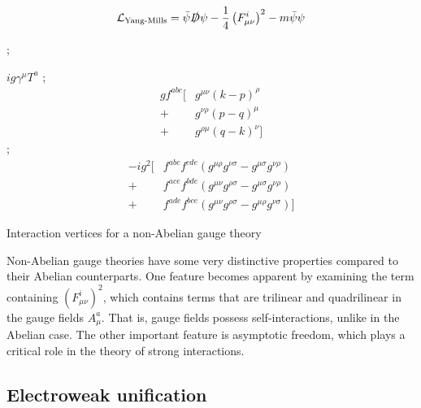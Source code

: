 $$\mathcal{L}_\text{Yang-Mills} = \bar{\psi}\slashed{D}\psi - \frac{1}{4}\left(F_{\mu\nu}^i\right)^2 - m\bar{\psi}\psi$$
\begin{marginfigure}[-3cm]
  ;

  $ig\gamma^\mu T^a$
\vskip 1cm
;
\begin{align*}
  gf^{abc}[&g^{\mu\nu}(k-p)^\rho\\
          +&g^{\nu\rho}(p-q)^\mu\\
          +&g^{\rho\mu}(q-k)^\nu]
\end{align*}
\vskip 1cm
;
\begin{align*}
 -ig^2[&f^{abc}f^{cde}(g^{\mu\rho}g^{\nu\sigma}-g^{\mu\sigma}g^{\nu\rho})\\
       +&f^{ace}f^{bde}(g^{\mu\nu}g^{\rho\sigma}-g^{\mu\sigma}g^{\nu\rho})\\
       +&f^{ade}f^{bce}(g^{\mu\nu}g^{\rho\sigma}-g^{\mu\rho}g^{\nu\sigma})]
\end{align*}
\caption{Interaction vertices for a non-Abelian gauge theory}
\end{marginfigure}
Non-Abelian gauge theories have some very distinctive properties compared to their Abelian counterparts. One feature becomes apparent by examining the term containing $(F_{\mu\nu}^i)^2$, which contains terms that are trilinear and quadrilinear in the gauge fields $A_\mu^a$. That is, gauge fields possess self-interactions, unlike in the Abelian case. The other important feature is asymptotic freedom, which plays a critical role in the theory of strong interactions. 

\subsection{Electroweak unification}

